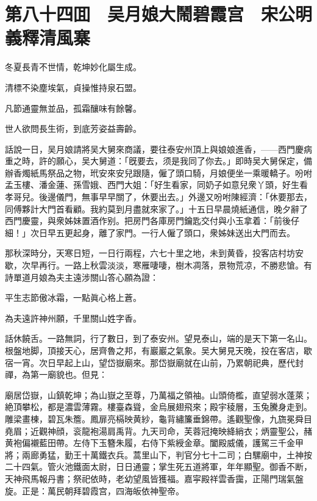 \chapter*{第八十四囬　吴月娘大鬧碧霞宫　宋公明義釋清風寨}

冬夏長青不世情，乾坤妙化屬生成。

清標不染塵埃氣，貞操惟持泉石盟。

凡節通靈無並品，孤霜釀味有餘馨。

世人欲問長生術，到底芳姿益壽齡。

話說一日，吴月娘請將吴大舅來商議，要往泰安州頂上與娘娘進香，——西門慶病重之時，許的願心，吴大舅道：「旣要去，须是我同了你去。」即時吴大舅保定，備辦香燭紙馬祭品之物，玳安來安兒跟隨，僱了頭口騎，月娘便坐一乘暖轎子。吩咐孟玉樓、潘金蓮、孫雪娥、西門大姐：「好生看家，同奶子如意兒衆丫頭，好生看孝哥兒。後邊儀門，無事早早關了，休要出去。」外邊又吩咐陳經濟：「休要那去，同傅夥計大門首看顧。我約莫到月盡就來家了。」十五日早晨燒紙通信，晚夕辭了西門慶靈，與衆姊妹置酒作别。把房門各庫房門鑰匙交付與小玉拿着：「前後仔細！」次日早五更起身，離了家門。一行人僱了頭口，衆姊妹送出大門而去。

那秋深時分，天寒日短，一日行兩程，六七十里之地，未到黄昏，投客店村坊安歇，次早再行。一路上秋雲淡淡，寒雁啛啛，樹木凋落，景物荒凉，不勝悲愴。有詩單道月娘為夫主遠涉關山答心願為證：

平生志節傲冰霜，一點眞心格上蒼。

為夫遠許神州願，千里關山姓字香。

話休饒舌。一路無詞，行了數日，到了泰安州。望見泰山，端的是天下第一名山。根盤地脚，頂接天心，居齊魯之邦，有巖巖之氣象。吴大舅見天晚，投在客店，歇宿一宵。次日早起上山，望岱嶽廟來。那岱嶽廟就在山前，乃累朝祀典，歷代封禪，為第一廟貌也。但見：

廟居岱嶽，山鎮乾坤；為山嶽之至尊，乃萬福之領袖。山頭倚檻，直望弱水蓬萊；絶頂攀松，都是濃雲薄霧。樓臺森聳，金烏展翅飛來；殿宇稜層，玉兔騰身走到。雕梁畫棟，碧瓦朱簷。鳳扉亮槅映黄紗，龜背繡簾垂錦帶。遙觀聖像，九旒冕舜目堯眉；近觀神顔，衮龍袍湯肩禹背。九天司命，芙蓉冠掩映絳綃衣；炳靈聖公，赭黄袍偏襯藍田帶。左侍下玉簪朱履，右侍下紫綬金章。闔殿威儀，護駕三千金甲將；兩廊勇猛，勤王十萬鐵衣兵。蒿里山下，判官分七十二司；白騾廟中，土神按二十四氣。管火池鐵面太尉，日日通靈；掌生死五道將軍，年年顯聖。御香不断，天神飛馬報丹書；祭祀依時，老幼望風皆獲福。嘉寜殿祥雲香靄，正陽門瑞氣盤旋。正是：萬民朝拜碧霞宫，四海皈依神聖帝。

